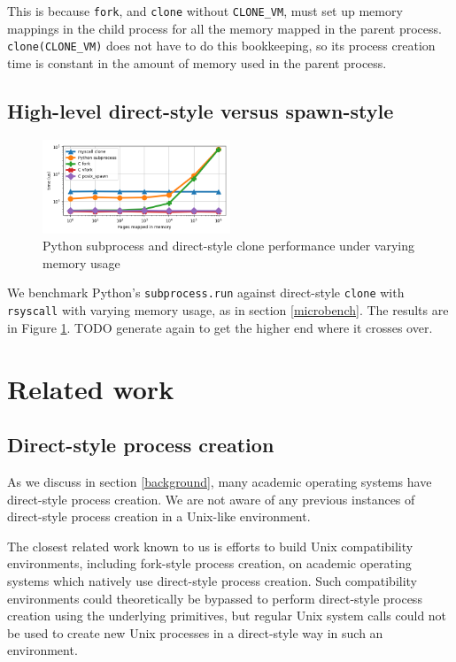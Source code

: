 \documentclass[sigplan]{acmart}
\begin{document}
This is because \texttt{fork}, and \texttt{clone} without \verb|CLONE_VM|,
must set up memory mappings in the child process for all the memory mapped in the parent process.
\verb|clone(CLONE_VM)| does not have to do this bookkeeping,
so its process creation time is constant in the amount of memory used in the parent process.

\subsection{High-level direct-style versus spawn-style}\label{subprocess_bench}
\begin{figure}[h!]
\centering
 \includegraphics[width=0.5\textwidth]{subprocess_bench}
 \caption{Python subprocess and direct-style clone performance under varying memory usage}
 \label{fig:subprocess_bench}
\end{figure}

We benchmark Python's \texttt{subprocess.run} against direct-style \texttt{clone} with \texttt{rsyscall}
with varying memory usage, as in section \ref{microbench}.
The results are in Figure \ref{fig:subprocess_bench}.
TODO generate again to get the higher end where it crosses over.
\section{Related work}\label{related_work}
\subsection{Direct-style process creation}
As we discuss in section \ref{background},
many academic operating systems have direct-style process creation.
We are not aware of any previous instances of direct-style process creation in a Unix-like environment.

The closest related work known to us
is efforts to build Unix compatibility environments, including fork-style process creation,
on academic operating systems which natively use direct-style process creation.\cite{exokernel}
Such compatibility environments could theoretically be bypassed to perform direct-style process creation
using the underlying primitives,
but regular Unix system calls could not be used to create new Unix processes in a direct-style way
in such an environment.
\end{document}
